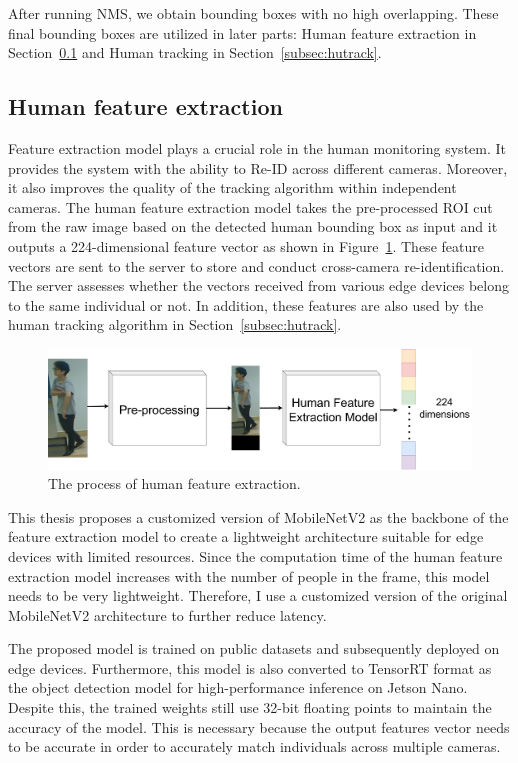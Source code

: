 \documentclass[../main.tex]{subfiles}
\begin{document}
After running NMS, we obtain bounding boxes with no high overlapping. These final bounding boxes are utilized in later parts: Human feature extraction in Section~\ref{subsec:hfext} and Human tracking in Section~\ref{subsec:hutrack}.

\subsection{Human feature extraction}
\label{subsec:hfext}
Feature extraction model plays a crucial role in the human monitoring system. It provides the system with the ability to Re-ID across different cameras. Moreover, it also improves the quality of the tracking algorithm within independent cameras. The human feature extraction model takes the pre-processed ROI cut from the raw image based on the detected human bounding box as input and it outputs a 224-dimensional feature vector as shown in Figure~\ref{fig:feature}. These feature vectors are sent to the server to store and conduct cross-camera re-identification. The server assesses whether the vectors received from various edge devices belong to the same individual or not. In addition, these features are also used by the human tracking algorithm in Section~\ref{subsec:hutrack}.

\begin{figure}[h!]
\centering
\includegraphics[width=\linewidth]{Figure/overview_feature.pdf}
\caption{The process of human feature extraction.}
\label{fig:feature}
\end{figure}

This thesis proposes a customized version of MobileNetV2 as the backbone of the feature extraction model to create a lightweight architecture suitable for edge devices with limited resources. Since the computation time of the human feature extraction model increases with the number of people in the frame, this model needs to be very lightweight. Therefore, I use a customized version of the original MobileNetV2 architecture to further reduce latency.

The proposed model is trained on public datasets and subsequently deployed on edge devices. Furthermore, this model is also converted to TensorRT format as the object detection model for high-performance inference on Jetson Nano. Despite this, the trained weights still use 32-bit floating points to maintain the accuracy of the model. This is necessary because the output features vector needs to be accurate in order to accurately match individuals across multiple cameras.
\end{document}
